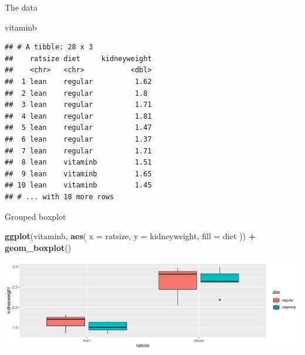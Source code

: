 \documentclass[
  ignorenonframetext,
]{beamer}
\newenvironment{Shaded}{\begin{snugshade}}{\end{snugshade}}
\newcommand{\DataTypeTok}[1]{\textcolor[rgb]{0.13,0.29,0.53}{#1}}
\newcommand{\KeywordTok}[1]{\textcolor[rgb]{0.13,0.29,0.53}{\textbf{#1}}}
\newcommand{\NormalTok}[1]{#1}
\newcommand{\OperatorTok}[1]{\textcolor[rgb]{0.81,0.36,0.00}{\textbf{#1}}}
\newcommand{\StringTok}[1]{\textcolor[rgb]{0.31,0.60,0.02}{#1}}
\begin{document}
\begin{frame}[fragile]{The data}
\protect\hypertarget{the-data-7}{}

\begin{Shaded}
\begin{Highlighting}[]
\NormalTok{vitaminb}
\end{Highlighting}
\end{Shaded}

\begin{verbatim}
## # A tibble: 28 x 3
##    ratsize diet     kidneyweight
##    <chr>   <chr>           <dbl>
##  1 lean    regular          1.62
##  2 lean    regular          1.8 
##  3 lean    regular          1.71
##  4 lean    regular          1.81
##  5 lean    regular          1.47
##  6 lean    regular          1.37
##  7 lean    regular          1.71
##  8 lean    vitaminb         1.51
##  9 lean    vitaminb         1.65
## 10 lean    vitaminb         1.45
## # ... with 18 more rows
\end{verbatim}

\end{frame}

\begin{frame}[fragile]{Grouped boxplot}
\protect\hypertarget{grouped-boxplot}{}

\begin{Shaded}
\begin{Highlighting}[]
\KeywordTok{ggplot}\NormalTok{(vitaminb, }\KeywordTok{aes}\NormalTok{(}
  \DataTypeTok{x =}\NormalTok{ ratsize, }\DataTypeTok{y =}\NormalTok{ kidneyweight,}
  \DataTypeTok{fill =}\NormalTok{ diet}
\NormalTok{)) }\OperatorTok{+}\StringTok{ }\KeywordTok{geom_boxplot}\NormalTok{()}
\end{Highlighting}
\end{Shaded}

\includegraphics{slides_d29_files/figure-beamer/unnamed-chunk-196-1.pdf}

\end{frame}
\end{document}
